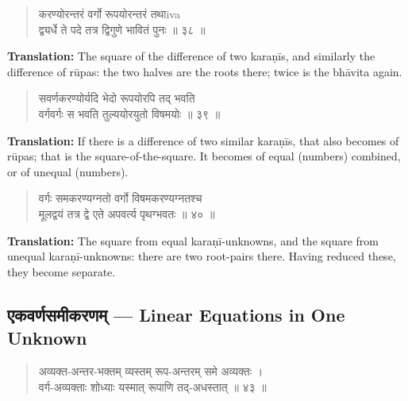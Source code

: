 \documentclass[11pt,a4paper]{article}
\newcommand{\dev}[1]{{\devanagarifont #1}}
\newenvironment{shloka}{\begin{verse}\devanagarifont\large}{\end{verse}}
\begin{document}
\vspace{0.3cm}

\begin{shloka}
करण्योरन्तरं वर्गो रूपयोरन्तरं तथाiva \\
द्व्यर्धे ते पदे तत्र द्विगुणे भावितं पुनः ॥ ३८ ॥
\end{shloka}

\textbf{Translation:}\quad
The square of the difference of two karaṇīs, and similarly the
difference of rūpas: the two halves are the roots there; twice is
the bhāvita again.

\vspace{0.3cm}

\begin{shloka}
सवर्णकरण्योर्यदि भेदो रूपयोरपि तद् भवति \\
वर्गवर्गः स भवति तुल्ययोरयुतो विषमयोः ॥ ३९ ॥
\end{shloka}

\textbf{Translation:}\quad
If there is a difference of two similar karaṇīs, that also becomes
of rūpas; that is the square-of-the-square. It becomes of equal
(numbers) combined, or of unequal (numbers).

\vspace{0.3cm}

\begin{shloka}
वर्गः समकरण्यग्नतो वर्गो विषमकरण्यग्नतश्च \\
मूलद्वयं तत्र द्वे एते अपवर्त्य पृथग्भवतः ॥ ४० ॥
\end{shloka}

\textbf{Translation:}\quad
The square from equal karaṇī-unknowns, and the square from unequal
karaṇī-unknowns: there are two root-pairs there. Having reduced
these, they become separate.

\vspace{0.3cm}

\newpage

\subsection*{\dev{एकवर्णसमीकरणम् — Linear Equations in One Unknown}}

\begin{shloka}
अव्यक्त-अन्तर-भक्तम् व्यस्तम् रूप-अन्तरम् समे अव्यक्तः ।\\
वर्ग-अव्यक्ताः शोध्याः यस्मात् रूपाणि तद्-अधस्तात् ॥ ४३ ॥
\end{shloka}
\end{document}
